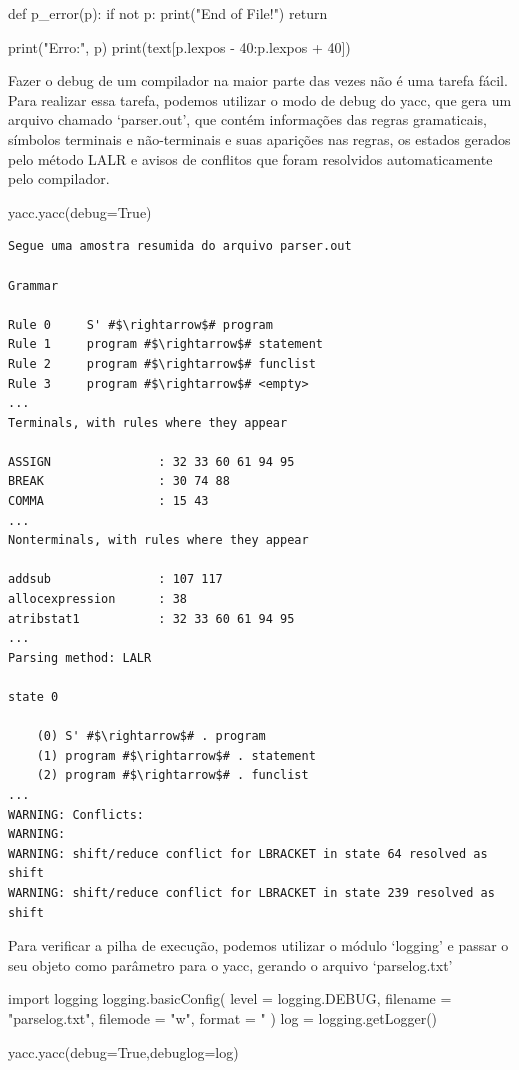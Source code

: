 \documentclass[
	12pt,				%
	openright,			%
	twoside,			%
	a4paper,			%
	english,			%
	french,				%
	spanish,			%
	brazil				%
	]{abntex2}
\begin{document}
\begin{python}
def p_error(p):
    if not p:
        print("End of File!")
        return

    print("Erro:", p)
    print(text[p.lexpos - 40:p.lexpos + 40])   
\end{python} 

Fazer o debug de um compilador na maior parte das vezes não é uma tarefa fácil.
Para realizar essa tarefa, podemos utilizar o modo de debug do yacc, que gera um
arquivo chamado `parser.out', que contém informações das regras gramaticais,
símbolos terminais e não-terminais e suas aparições nas regras, os estados gerados
pelo método LALR e avisos de conflitos que foram resolvidos automaticamente pelo compilador.

\begin{python}
    yacc.yacc(debug=True)
\end{python}

\begin{lstlisting}
Segue uma amostra resumida do arquivo parser.out

Grammar

Rule 0     S' #$\rightarrow$# program
Rule 1     program #$\rightarrow$# statement
Rule 2     program #$\rightarrow$# funclist
Rule 3     program #$\rightarrow$# <empty>
... 
Terminals, with rules where they appear

ASSIGN               : 32 33 60 61 94 95
BREAK                : 30 74 88
COMMA                : 15 43
...
Nonterminals, with rules where they appear

addsub               : 107 117
allocexpression      : 38
atribstat1           : 32 33 60 61 94 95
... 
Parsing method: LALR

state 0

    (0) S' #$\rightarrow$# . program
    (1) program #$\rightarrow$# . statement
    (2) program #$\rightarrow$# . funclist
... 
WARNING: Conflicts:
WARNING: 
WARNING: shift/reduce conflict for LBRACKET in state 64 resolved as shift
WARNING: shift/reduce conflict for LBRACKET in state 239 resolved as shift
\end{lstlisting}

Para verificar a pilha de execução, podemos utilizar o módulo `logging' e
passar o seu objeto como parâmetro para o yacc, gerando o arquivo `parselog.txt'

\begin{python}
import logging
logging.basicConfig(
    level = logging.DEBUG,
    filename = "parselog.txt",
    filemode = "w",
    format = "%
)
log = logging.getLogger()

yacc.yacc(debug=True,debuglog=log)
\end{python}
\end{document}
